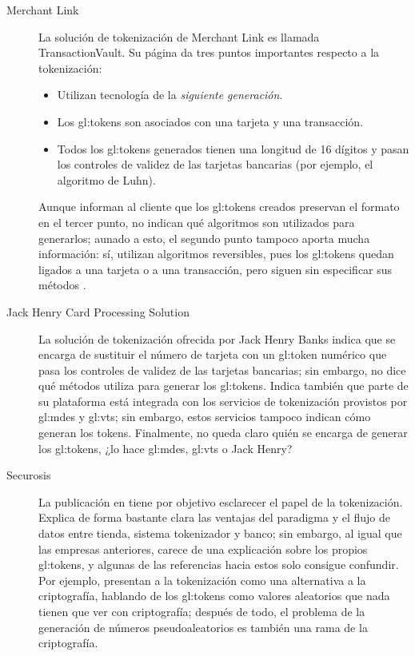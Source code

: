 \begin{description}
  \item[Merchant Link]
    La solución de tokenización de Merchant Link es llamada TransactionVault. Su
    página da tres puntos importantes respecto a la tokenización:
    \begin{itemize}
      \item Utilizan tecnología de la \textit{siguiente generación}.
      \item Los \glspl{gl:token} son asociados con una tarjeta y una
        transacción.
      \item Todos los \glspl{gl:token} generados tienen una longitud de 16
        dígitos y pasan los controles de validez de las tarjetas bancarias
        (por ejemplo, el algoritmo de Luhn\footnotemark).
      \end{itemize}
      Aunque informan al cliente que los \glspl{gl:token} creados preservan el
      formato en el tercer punto, no indican qué algoritmos son utilizados para
      generarlos; aunado a esto, el segundo punto tampoco aporta mucha
      información: sí, utilizan algoritmos reversibles\footnotemark, pues los
      \glspl{gl:token} quedan ligados a una tarjeta o a una transacción,
      pero siguen sin especificar sus métodos \cite{merchant_link}.



    \item[Jack Henry Card Processing Solution]
      La solución de tokenización ofrecida por Jack Henry Banks indica que se
      encarga de sustituir el número de tarjeta con un \gls{gl:token} numérico
      que pasa los controles de validez  de las tarjetas bancarias; sin
      embargo, no dice qué métodos utiliza para generar los \glspl{gl:token}.
      Indica también que parte de su plataforma está integrada con los servicios
      de tokenización provistos por \gls{gl:mdes} y \gls{gl:vts}; sin embargo,
      estos servicios tampoco indican cómo generan los tokens. Finalmente, no
      queda claro quién se encarga de generar los \glspl{gl:token}, ¿lo hace
      \gls{gl:mdes}, \gls{gl:vts} o Jack Henry?\cite{jack_henry, mdes_1, mdes_2}

    \item[Securosis]
      La publicación en \cite{securosis} tiene por objetivo esclarecer el papel
      de la tokenización. Explica de forma bastante clara las ventajas del
      paradigma y el flujo de datos entre tienda, sistema tokenizador y banco;
      sin embargo, al igual que las empresas anteriores, carece de una
      explicación sobre los propios \glspl{gl:token}, y algunas de las
      referencias hacia estos solo consigue confundir. Por ejemplo, presentan
      a la tokenización como una alternativa a la criptografía, hablando
      de los \glspl{gl:token} como valores aleatorios que nada tienen que
      ver con criptografía; después de todo, el problema de la generación
      de números pseudoaleatorios es también una rama de la criptografía.


\end{description}
